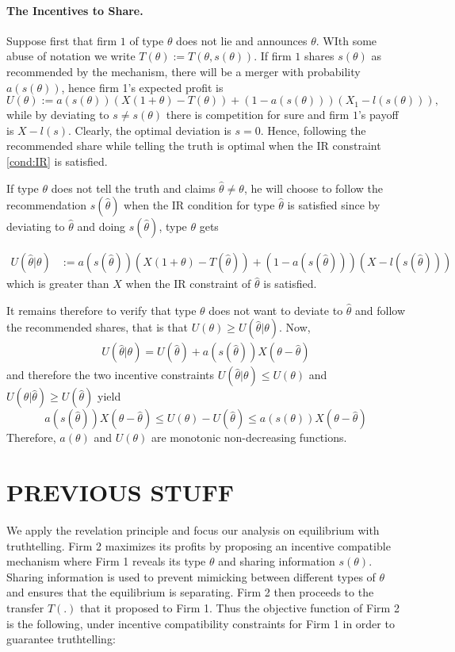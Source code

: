 \documentclass[a4paper]{article}
\renewcommand{\th}{\hat\theta}
\renewcommand{\t}{\theta}
\begin{document}
\paragraph{The Incentives to Share.}
Suppose first that firm $1$ of type $\t$ does not lie and announces $\t$.  WIth some abuse of notation we write $ T(\t):=T(\t,s(\t))$. If firm $1$ shares $s(\t)$ as recommended by the mechanism, there will be a merger with probability $a(s(\t))$, hence firm 1's expected profit is
\[
U(\t):= a(s(\t))(X(1+\t)-T(\t))+(1-a(s(\t)))(X_1-l(s(\t))),
\]
while by deviating to $s\neq s(\t)$ there is competition for sure and firm $1$'s payoff is $X-l(s)$. Clearly, the optimal deviation is $s=0$. Hence,  following the recommended share while telling the truth is optimal when the IR constraint \eqref{cond:IR} is satisfied.

If type $\t$ does not tell the truth and claims $\th\neq \t$, he will choose to follow the recommendation $s(\th)$ when the IR condition for type $\th$ is satisfied since by deviating to $\th$ and doing $s(\th)$, type $\t$ gets

  \begin{align*}
    U(\th|\t)&:=a(s(\th))(X(1+\t)-T(\th))+(1-a(s(\th)))(X-l(s(\th)))
  \end{align*}
which is greater than $X$ when the IR constraint of $\th$ is satisfied.

It remains therefore to verify that type $\t$ does not want to deviate to $\th$ and follow the recommended shares, that is that $U(\t)\geq U(\th|\t)$. Now,
\begin{align*}
U(\th|\t)=U(\th)+a(s(\th))X(\t-\th)
\end{align*}
%
and therefore the two incentive constraints $U(\th|\t)\leq U(\t)$ and $U(\t|\th)\geq U(\th)$ yield
\[
a(s(\th))X(\t-\th)\leq U(\t)-U(\th)\leq a(s(\t))X(\t-\th)
\]
Therefore, $a(\t)$ and $U(\t)$ are monotonic non-decreasing functions.

\section{PREVIOUS STUFF}
%   
%    

We apply the revelation principle and focus our analysis on equilibrium with truthtelling. Firm 2 maximizes its profits by proposing an incentive compatible mechanism where Firm 1 reveals its type $\t$ and sharing information $s(\t)$. Sharing information is used to prevent mimicking between different types of $\t$ and ensures that the equilibrium is separating. Firm 2 then proceeds to the transfer $T(.)$ that it proposed to Firm 1. Thus the objective function of Firm 2 is the following, under incentive compatibility constraints for Firm 1 in order to guarantee truthtelling:
\end{document}
